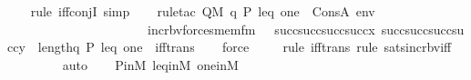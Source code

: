 \begin{isabellebody}
\ \ \ \isamarkupfalse%
{\isacharparenleft}{\kern0pt}rule\ iff{\isacharunderscore}{\kern0pt}conjI{}{\isacharcomma}{\kern0pt}\ simp{\isacharparenright}{\kern0pt}\isanewline
\ \ \ \isamarkupfalse%
{\isacharparenleft}{\kern0pt}rule{\isacharunderscore}{\kern0pt}tac\ Q{\isacharequal}{\kern0pt}{\isachardoublequoteopen}M{\isacharcomma}{\kern0pt}\ {\isacharbrackleft}{\kern0pt}q{\isacharcomma}{\kern0pt}\ P{\isacharcomma}{\kern0pt}\ leq{\isacharcomma}{\kern0pt}\ one{\isacharbrackright}{\kern0pt}\ {\isacharat}{\kern0pt}\ Cons{\isacharparenleft}{\kern0pt}A{\isacharcomma}{\kern0pt}\ env{\isacharparenright}{\kern0pt}\ {\isasymTurnstile}\ \isanewline
\ \ \ \ \ \ \ \ \ \ \ \ \ \ \ \ \ \ \ \ \ \ incr{\isacharunderscore}{\kern0pt}bv{\isacharparenleft}{\kern0pt}forces{\isacharunderscore}{\kern0pt}mem{\isacharunderscore}{\kern0pt}fm{\isacharparenleft}{\kern0pt}{}{\isacharcomma}{\kern0pt}\ {}{\isacharcomma}{\kern0pt}\ {}{\isacharcomma}{\kern0pt}\ succ{\isacharparenleft}{\kern0pt}succ{\isacharparenleft}{\kern0pt}succ{\isacharparenleft}{\kern0pt}succ{\isacharparenleft}{\kern0pt}x{\isacharparenright}{\kern0pt}{\isacharparenright}{\kern0pt}{\isacharparenright}{\kern0pt}{\isacharparenright}{\kern0pt}{\isacharcomma}{\kern0pt}\ succ{\isacharparenleft}{\kern0pt}succ{\isacharparenleft}{\kern0pt}succ{\isacharparenleft}{\kern0pt}succ{\isacharparenleft}{\kern0pt}y{\isacharparenright}{\kern0pt}{\isacharparenright}{\kern0pt}{\isacharparenright}{\kern0pt}{\isacharparenright}{\kern0pt}{\isacharparenright}{\kern0pt}{\isacharparenright}{\kern0pt}\ {\isacharbackquote}{\kern0pt}\ length{\isacharparenleft}{\kern0pt}{\isacharbrackleft}{\kern0pt}q{\isacharcomma}{\kern0pt}\ P{\isacharcomma}{\kern0pt}\ leq{\isacharcomma}{\kern0pt}\ one{\isacharbrackright}{\kern0pt}{\isacharparenright}{\kern0pt}{\isachardoublequoteclose}\ \ iff{\isacharunderscore}{\kern0pt}trans{\isacharparenright}{\kern0pt}\isanewline
\ \ \isamarkupfalse%
\ force\ \isanewline
\ \ \ \isamarkupfalse%
{\isacharparenleft}{\kern0pt}rule\ iff{\isacharunderscore}{\kern0pt}trans{\isacharcomma}{\kern0pt}\ rule\ sats{\isacharunderscore}{\kern0pt}incr{\isacharunderscore}{\kern0pt}bv{\isacharunderscore}{\kern0pt}iff{\isacharparenright}{\kern0pt}\isanewline
\ \ \ \ \ \ \ \isamarkupfalse%
\ auto{\isacharbrackleft}{\kern0pt}{}{\isacharbrackright}{\kern0pt}\isanewline
\ \ \isamarkupfalse%
\ P{\isacharunderscore}{\kern0pt}in{\isacharunderscore}{\kern0pt}M\ leq{\isacharunderscore}{\kern0pt}in{\isacharunderscore}{\kern0pt}M\ one{\isacharunderscore}{\kern0pt}in{\isacharunderscore}{\kern0pt}M\isanewline

\end{isabellebody}
